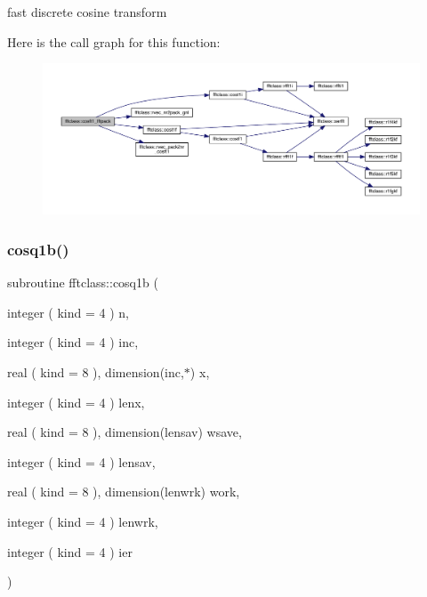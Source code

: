 fast discrete cosine transform 

Here is the call graph for this function\+:\nopagebreak
\begin{figure}[H]
\begin{center}
\leavevmode
\includegraphics[width=350pt]{namespacefftclass_ac4347b89b0b1a5894943daa3f37c54ee_cgraph}
\end{center}
\end{figure}
\mbox{\label{namespacefftclass_a6684b378360642f160b255df6b3aa0bd}} 
\subsubsection{\texorpdfstring{cosq1b()}{cosq1b()}}
{\footnotesize\ttfamily subroutine fftclass\+::cosq1b (\begin{DoxyParamCaption}\item[{integer ( kind = 4 )}]{n,  }\item[{integer ( kind = 4 )}]{inc,  }\item[{real ( kind = 8 ), dimension(inc,$\ast$)}]{x,  }\item[{integer ( kind = 4 )}]{lenx,  }\item[{real ( kind = 8 ), dimension(lensav)}]{wsave,  }\item[{integer ( kind = 4 )}]{lensav,  }\item[{real ( kind = 8 ), dimension(lenwrk)}]{work,  }\item[{integer ( kind = 4 )}]{lenwrk,  }\item[{integer ( kind = 4 )}]{ier }\end{DoxyParamCaption})}

